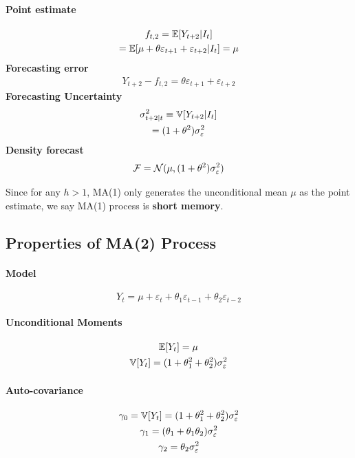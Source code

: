 \documentclass[11pt]{article}
\begin{document}
				\paragraph{Point estimate}
					\begin{gather}
						f_{t,2} = \mathbb{E}[{Y_{t+2} | I_t}] \\
						= \mathbb{E}[{\mu + \theta \varepsilon_{t+1} + \varepsilon_{t+2} | I_t}]
						= \mu
					\end{gather}
				\textbf{Forecasting error}
					\begin{gather}
						Y_{t+2} - f_{t,2} = \theta \varepsilon_{t+1} + \varepsilon_{t+2}
					\end{gather}
				\textbf{Forecasting Uncertainty}
					\begin{gather}
						\sigma_{t+2|t}^2 \equiv \mathbb{V}[{Y_{t+2} | I_t}] \\
						= (1 + \theta^2) \sigma_{\varepsilon}^2 
					\end{gather}
				\textbf{Density forecast}
					\begin{gather}
						\mathcal{{F}} = \mathcal{{N}}(\mu, (1 + \theta^2)\sigma_{\varepsilon}^2)
					\end{gather}
				\begin{remark}
					Since for any $h > 1$, MA(1) only generates the unconditional mean $\mu$ as the point estimate, we say MA(1) process is \textbf{short memory}.
				\end{remark}
		\subsection{Properties of MA(2) Process}
			\paragraph{Model}
				\begin{equation}
					Y_t = \mu + \varepsilon_t + \theta_1 \varepsilon_{t-1} + \theta_2 \varepsilon_{t-2}
				\end{equation}
			\paragraph{Unconditional Moments}
				\begin{gather}
					\mathbb{E}[{Y_t}] = \mu \\
					\mathbb{V}[{Y_t}] = (1 + \theta_1^2 + \theta_2^2) \sigma_\varepsilon^2
				\end{gather}
			\paragraph{Auto-covariance}
				\begin{gather}
					\gamma_0 = \mathbb{V}[{Y_t}] = (1 + \theta_1^2 + \theta_2^2) \sigma_\varepsilon^2 \\
					\gamma_1 = (\theta_1 + \theta_1 \theta_2) \sigma_\varepsilon^2 \\
					\gamma_2 = \theta_2 \sigma_\varepsilon^2
				\end{gather}
\end{document}
